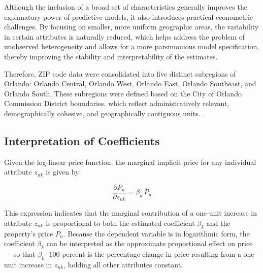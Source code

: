 Although the inclusion of a broad set of characteristics generally improves the explanatory power of predictive models, it also introduces practical econometric challenges. By focusing on smaller, more uniform geographic areas, the variability in certain attributes is naturally reduced, which helps address the problem of unobserved heterogeneity and allows for a more parsimonious model specification, thereby improving the stability and interpretability of the estimates.

Therefore, ZIP code data were consolidated into five distinct subregions of Orlando: Orlando Central, Orlando West, Orlando East, Orlando Southeast, and Orlando South. These subregions were defined based on the City of Orlando Commission District boundaries, which reflect administratively relevant, demographically cohesive, and geographically contiguous units. \citep{orangecounty2025}.



\subsection*{Interpretation of Coefficients}

Given the log-linear price function, the marginal implicit price for any individual attribute $z_{nk}$ is given by:

\[
\frac{\partial P_n}{\partial z_{nk}} = \beta_k \, P_n
\]

\noindent This expression indicates that the marginal contribution of a one-unit increase in attribute $z_{nk}$ is proportional to both the estimated coefficient $\beta_k$ and the property's price $P_n$. Because the dependent variable is in logarithmic form, the coefficient $\beta_k$ can be interpreted as the approximate proportional effect on price --- so that $\beta_k \cdot 100$ percent  is the percentage change in price resulting from a one-unit increase in $z_{nk}$, holding all other attributes constant.
